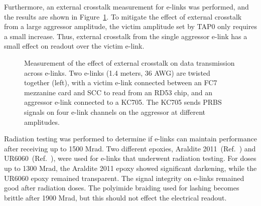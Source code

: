\documentclass[a4paper,11pt]{article}
\newcommand{\mrad}{Mrad}
\newcommand{\fig}{Figure}
\begin{document}

Furthermore, an external crosstalk measurement for e-links was performed, and the results are shown in \fig~\ref{fig:external_crosstalk}.
To mitigate the effect of external crosstalk from a large aggressor amplitude, the victim amplitude set by TAP0 only requires a small increase.
Thus, external crosstalk from the single aggressor e-link has a small effect on readout over the victim e-link.

\begin{figure}[htbp]
\centering
{}
\hspace*{.2in}
\caption{
\label{fig:external_crosstalk}
Measurement of the effect of external crosstalk on data transmission across e-links.
Two e-links (1.4 meters, 36 AWG) are twisted together (left), with a victim e-link connected between an FC7 mezzanine card and SCC to read from an RD53 chip, and an aggressor e-link connected to a KC705.
The KC705 sends PRBS signals on four e-link channels on the aggressor at different amplitudes.
}
\end{figure}

Radiation testing was performed to determine if e-links can maintain performance after receiving up to 1500 \mrad.
Two different epoxies, Araldite 2011~(Ref.~\cite{ref:araldite}) and UR6060~(Ref.~\cite{ref:ur}), were used for e-links that underwent radiation testing.
For doses up to 1300 \mrad, the Araldite 2011 epoxy showed significant darkening, while the UR6060 epoxy remained transparent.
The signal integrity on e-links remained good after radiation doses.
The polyimide braiding used for lashing becomes brittle after 1900 \mrad, but this should not effect the electrical readout.
\end{document}
